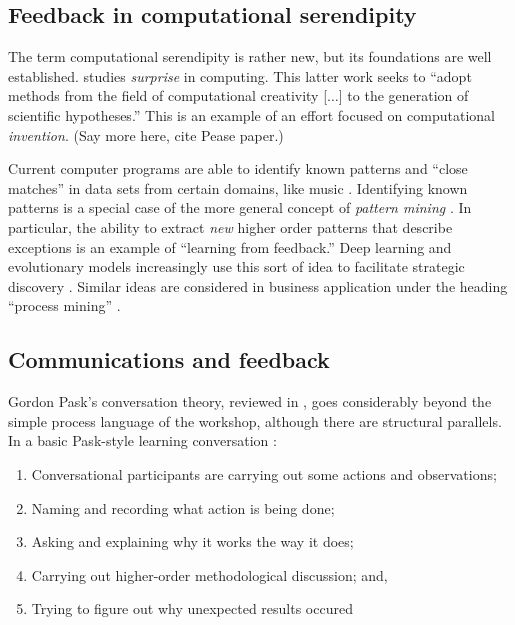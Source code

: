 \subsection{Feedback in computational serendipity}

The term computational serendipity is rather new, but its foundations
are well established.   studies \emph{surprise}
in computing.  This latter work seeks to ``adopt methods from the
field of computational creativity [$\ldots$] to the generation of
scientific hypotheses.''  This is an example of an effort focused on
computational \emph{invention}. (Say more here, cite Pease paper.)

Current computer programs are able to identify known patterns and
``close matches'' in data sets from certain domains, like music
\cite{meredith2002algorithms}.  Identifying known patterns is a
special case of the more general concept of \emph{pattern mining}
\cite{bergeron2007representation}.  In particular, the ability to
extract \emph{new} higher order patterns that describe exceptions is
an example of ``learning from feedback.''  Deep learning and
evolutionary models increasingly use this sort of idea to facilitate
strategic discovery \cite{samothrakis2011approximating}.  Similar
ideas are considered in business application under the heading
``process mining'' \cite{van2011process}.

\subsection{Communications and feedback}

Gordon Pask's conversation theory, reviewed in
\cite{conversation-theory-review,boyd2004conversation}, goes
considerably beyond the simple process language of the workshop,
although there are structural parallels.  In a basic Pask-style
learning conversation \cite[p. 190]{boyd2004conversation}: 

\begin{center}
\begin{fminipage}{.8\columnwidth}
\begin{minipage}{1\textwidth}
\begin{enumerate}[itemsep=0pt,rightmargin=10pt]
\item Conversational participants are carrying
out some actions and observations;
\item Naming and recording what action is being done;
\item Asking and explaining why it works the way
it does;
\item Carrying out higher-order methodological discussion; and, 
\item Trying to figure out why unexpected results occured
\end{enumerate}
\end{minipage}
\end{fminipage}
\end{center}

